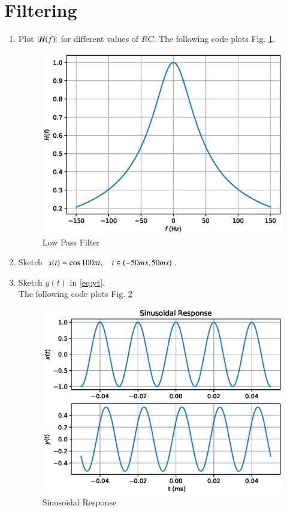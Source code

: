 \documentclass[journal,12pt,twocolumn]{IEEEtran}
\begin{document}
\section{Filtering}
\begin{enumerate}[1.]
\item  Plot $\left\vert H(f)\right\vert$ for different values of $RC$.
The following code plots Fig. \ref{fig:lpf}.

\begin{figure}[!h]
\centering
\includegraphics[width=\columnwidth]{./figs/lpf.eps}
\caption{Low Pass Filter} 
\label{fig:lpf}
\end{figure}
\item Sketch $x(t) = \cos 100\pi t, \quad t \in \left(-50 ms, 50 ms\right)$.
\item Sketch $y(t)$ in \eqref{eq:yt}.
\\
\solution The following code plots Fig. \ref{fig:xtyt}

\begin{figure}[!h]
\centering
\includegraphics[width=\columnwidth]{./figs/xtyt.eps}
\caption{Sinusoidal Response} 
\label{fig:xtyt}
\end{figure}


\end{enumerate}
\end{document}

